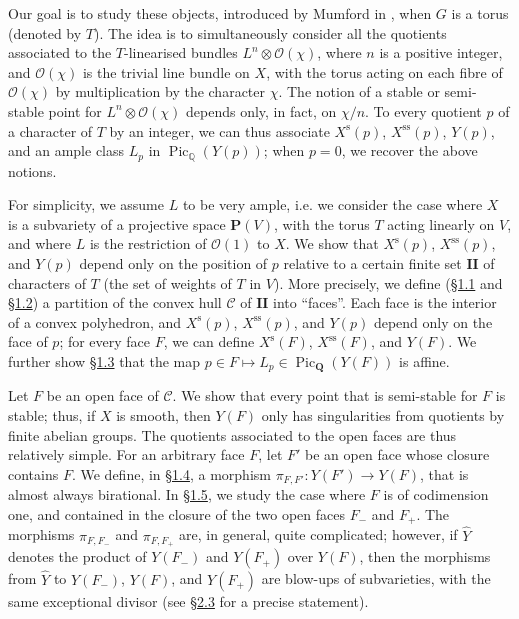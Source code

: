 \documentclass{article}
\newcommand{\scr}[1]{{\mathscr{#1}}}
\newcommand{\PP}{\mathbf{P}}
\newcommand{\QQ}{\mathbf{Q}}
\newcommand{\s}{\mathrm{s}}
\renewcommand{\ss}{\mathrm{ss}}
\newcommand{\II}{\mathbf{II}}
\DeclareMathOperator{\Pic}{Pic}
\newcommand{\oldpage}[1]{\marginpar{\footnotesize$\Big\vert$ \textit{p.~#1}}}
\begin{document}
Our goal is to study these objects, introduced by Mumford in \cite{MF}, when $G$ is a torus (denoted by $T$).
The idea is to simultaneously consider all the quotients associated to the $T$-linearised bundles $L^n\otimes\scr{O}(\chi)$, where $n$ is a positive integer, and $\scr{O}(\chi)$ is the trivial line bundle on $X$, with the torus acting on each fibre of $\scr{O}(\chi)$ by multiplication by the character $\chi$.
The notion of a stable or semi-stable point for $L^n\otimes\scr{O}(\chi)$ depends only, in fact, on $\chi/n$.
\oldpage{510}
To every quotient $p$ of a character of $T$ by an integer, we can thus associate $X^\s(p)$, $X^\ss(p)$, $Y(p)$, and an ample class $L_p$ in $\Pic_\mathbb{Q}(Y(p))$;
when $p=0$, we recover the above notions.

For simplicity, we assume $L$ to be very ample, i.e. we consider the case where $X$ is a subvariety of a projective space $\PP(V)$, with the torus $T$ acting linearly on $V$, and where $L$ is the restriction of $\scr{O}(1)$ to $X$.
We show that $X^\s(p)$, $X^\ss(p)$, and $Y(p)$ depend only on the position of $p$ relative to a certain finite set $\II$ of characters of $T$ (the set of weights of $T$ in $V$).
More precisely, we define (\hyperref[1.1]{\S1.1} and \hyperref[1.2]{\S1.2}) a partition of the convex hull $\mathcal{C}$ of $\II$ into ``faces''.
Each face is the interior of a convex polyhedron, and $X^\s(p)$, $X^\ss(p)$, and $Y(p)$ depend only on the face of $p$;
for every face $F$, we can define $X^\s(F)$, $X^\ss(F)$, and $Y(F)$.
We further show \hyperref[1.3]{\S1.3} that the map $p\in F\mapsto L_p\in\Pic_\QQ(Y(F))$ is affine.

Let $F$ be an open face of $\mathcal{C}$.
We show that every point that is semi-stable for $F$ is stable;
thus, if $X$ is smooth, then $Y(F)$ only has singularities from quotients by finite abelian groups.
The quotients associated to the open faces are thus relatively simple.
For an arbitrary face $F$, let $F'$ be an open face whose closure contains $F$.
We define, in \hyperref[1.4]{\S1.4}, a morphism $\pi_{F,F'}\colon Y(F')\to Y(F)$, that is almost always birational.
In \hyperref[1.5]{\S1.5}, we study the case where $F$ is of codimension one, and contained in the closure of the two open faces $F_-$ and $F_+$.
The morphisms $\pi_{F,F_-}$ and $\pi_{F,F_+}$ are, in general, quite complicated;
however, if $\hat{Y}$ denotes the product of $Y(F_-)$ and $Y(F_+)$ over $Y(F)$, then the morphisms from $\hat{Y}$ to $Y(F_-)$, $Y(F)$, and $Y(F_+)$ are blow-ups of subvarieties, with the same exceptional divisor (see \hyperref[2.3]{\S2.3} for a precise statement).
\end{document}
